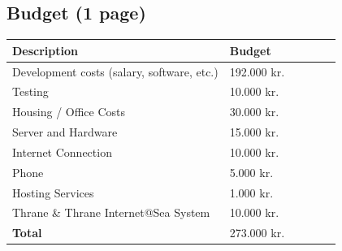 \documentclass[a4paper,10pt,dateno,oneside,fleqn,sigleft]{newlfm} %
\begin{document}
\begin{newlfm}
\section{Budget (1 page)}
\label{sec:budget}
\begin{center}
\begin{tabular}{l*{4}{l}l}
Description 	         									& Budget\\			
\hline
Development costs (salary, software, etc.) 					& 192.000 kr.\\
Testing 							 						& 10.000 kr.\\
Housing / Office Costs 		 								& 30.000 kr.\\
Server and Hardware 		 								& 15.000 kr.\\
Internet Connection 										& 10.000 kr.\\
Phone 														&  5.000 kr.\\
Hosting Services 											&  1.000 kr.\\
Thrane \& Thrane Internet@Sea System 						& 10.000 kr.\\
\hline
\textbf{Total} 												& 273.000 kr.
\end{tabular}
\end{center}



\end{newlfm}
\end{document}
